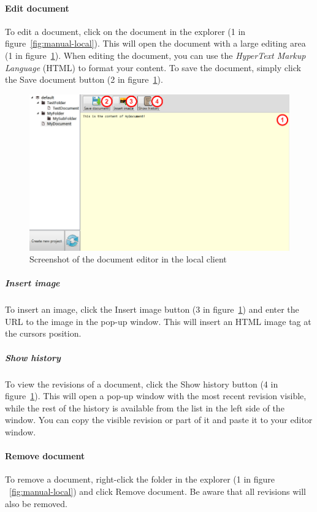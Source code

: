 	\paragraph{Edit document}
	To edit a document, click on the document in the explorer (1 in figure~\ref{fig:manual-local}). This will open the document with a large editing area (1 in figure~\ref{fig:manual-local-document}). When editing the document, you can use the \emph{HyperText Markup Language}\cite{w3cHTML} (HTML) to format your content. To save the document, simply click the Save document button (2 in figure~\ref{fig:manual-local-document}).
	
	\begin{figure}[htb]
		\centering
		\includegraphics[width=1\textwidth]{User_manual/graphics/local-document.png}
		\caption{Screenshot of the document editor in the local client}
		\label{fig:manual-local-document}
	\end{figure}
	
		\subparagraph{Insert image}
		To insert an image, click the Insert image button (3 in figure~\ref{fig:manual-local-document}) and enter the URL to the image in the pop-up window. This will insert an HTML image tag at the cursors position.
		
		\subparagraph{Show history}
		To view the revisions of a document, click the Show history button (4 in figure~\ref{fig:manual-local-document}). This will open a pop-up window with the most recent revision visible, while the rest of the history is available from the list in the left side of the window. You can copy the visible revision or part of it and paste it to your editor window.
	
	\paragraph{Remove document}
	To remove a document, right-click the folder in the explorer (1 in figure ~\ref{fig:manual-local}) and click Remove document. Be aware that all revisions will also be removed.
